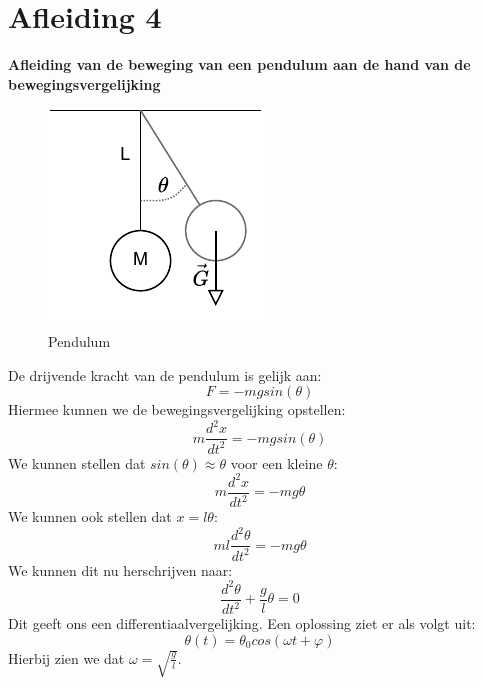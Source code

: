 \documentclass[a4paper,kul]{kulakarticle} %
\begin{document}
\section{Afleiding 4}
\textbf{Afleiding van de beweging van een pendulum aan de hand van de bewegingsvergelijking}
\begin{figure}[htbp]
	\centering
	\includegraphics[width=0.5\linewidth]{Pendulum}
	\caption[Pendulum]{Pendulum}
	\label{fig:pendulum}
\end{figure}
De drijvende kracht van de pendulum is gelijk aan:
\begin{equation*}
	F = -mg sin(\theta)
\end{equation*}
Hiermee kunnen we de bewegingsvergelijking opstellen:
\begin{equation*}
	m\frac{d^2x}{dt^2} = -mgsin(\theta)
\end{equation*}
We kunnen stellen dat $sin(\theta) \approx \theta$ voor een kleine $\theta$:
\begin{equation*}
	m\frac{d^2x}{dt^2} = -mg\theta
\end{equation*}
We kunnen ook stellen dat $x = l\theta$:
\begin{equation*}
	ml\frac{d^2\theta}{dt^2} = -mg\theta
\end{equation*}
We kunnen dit nu herschrijven naar:
\begin{equation*}
	\frac{d^2\theta}{dt^2} +\frac{g}{l}\theta = 0
\end{equation*}
Dit geeft ons een differentiaalvergelijking. Een oplossing ziet er als volgt uit:
\begin{equation*}
	\theta (t) = \theta_0 cos(\omega t +\varphi)
\end{equation*}
Hierbij zien we dat $\omega = \sqrt{\frac{g}{l}}$.
\newpage
\end{document}

